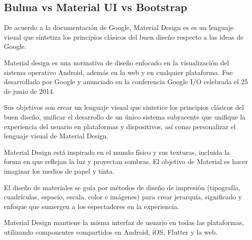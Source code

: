 \subsection{Bulma vs Material UI vs Bootstrap}
De acuerdo a la documentación de Google\cite{noauthor_introduction_nodate}, Material Design es es un lenguaje visual que sintetiza los principios clásicos del buen diseño respecto a las ideas de Google.

Material design es una normativa de diseño enfocado en la visualización del sistema operativo Android, además en la web y en cualquier plataforma. Fue desarrollado por Google y anunciado en la conferencia Google I/O celebrada el 25 de junio de 2014. 


Sus objetivos son crear un lenguaje visual que sintetice los principios clásicos del buen diseño, unificar el desarrollo de un único sistema subyacente que unifique la experiencia del usuario en plataformas y dispositivos, así como personalizar el lenguaje visual de Material Design.


Material Design está inspirado en el mundo físico y sus texturas, incluida la forma en que reflejan la luz y proyectan sombras. El objetivo de Material es hacer imaginar los medios de papel y tinta.


El diseño de materiales se guía por métodos de diseño de impresión (tipografía, cuadrículas, espacio, escala, color e imágenes) para crear jerarquía, significado y enfoque que sumergen a los espectadores en la experiencia.


Material Design mantiene la misma interfaz de usuario en todas las plataformas, utilizando componentes compartidos en Android, iOS, Flutter y la web.
